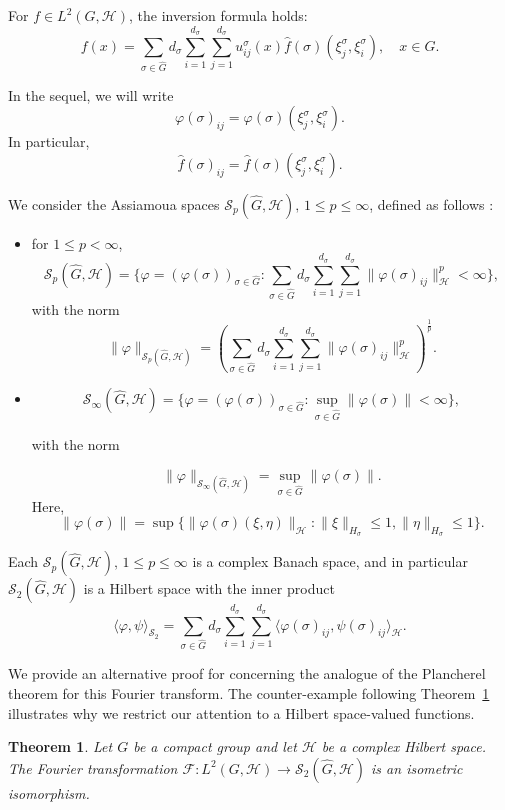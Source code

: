 \documentclass[11pt]{amsart}
\newtheorem{theorem}{Theorem}[section]
\begin{document}
For $f\in L^2(G,\mathcal{H})$, the inversion formula holds:
\begin{equation}\label{eq:inversionformula}
f(x)=\sum_{\sigma\in\widehat{G}}d_\sigma\sum_{i=1}^{d_\sigma}\sum_{j=1}^{d_\sigma}u^\sigma_{ij}(x)\widehat f(\sigma)(\xi_j^\sigma,
\xi_i^\sigma),\quad x\in G.
\end{equation}

In the sequel, we will write
$$\varphi(\sigma)_{ij}=\varphi(\sigma)(\xi_j^\sigma,
\xi_i^\sigma).$$ In particular, 
$$\widehat f(\sigma)_{ij}=\widehat f(\sigma)(\xi_j^\sigma,
\xi_i^\sigma).$$

We consider the Assiamoua spaces $\mathscr{S}_p(\widehat{G}, \mathcal{H}),\, 1\le p\le \infty$, defined as follows \cite{Mensah2024}:
\begin{itemize}
\item for $1\le p<\infty$, 
$$\mathscr{S}_p(\widehat{G},\mathcal{H})=\Big\{\varphi=(\varphi(\sigma))_{\sigma\in \widehat{G}}:
\sum_{\sigma\in \widehat{G}} d_\sigma\sum_{i=1}^{d_\sigma}\sum_{j=1}^{d_\sigma}\|\varphi(\sigma)_{ij}\|_\mathcal{H}^p<\infty\Big\},
$$
with the norm 
$$ \|\varphi\|_{\mathscr{S}_p(\widehat{G},\mathcal{H})}=\left(\sum_{\sigma\in \widehat{G}} d_\sigma\sum_{i=1}^{d_\sigma}\sum_{j=1}^{d_\sigma}\|\varphi(\sigma)_{ij}\|_\mathcal{H}^p\right)^{\frac{1}{p}}.
$$
\item $$\mathscr{S}_\infty(\widehat{G},\mathcal{H})=\Big\{  \varphi=(\varphi(\sigma))_{\sigma\in \widehat{G}}: \sup_{\sigma \in \widehat{G}}\|\varphi(\sigma)\| <\infty \Big\},$$

with the norm 

$$\|\varphi\|_{\mathscr{S}_\infty(\widehat{G},\mathcal{H})}=\sup_{\sigma \in \widehat{G}}\|\varphi(\sigma)\|.$$
Here,  
$$\|\varphi(\sigma)\|=\sup\Big\{\|\varphi(\sigma)(\xi,\eta)\|_{\mathcal{H}}: \|\xi\|_{H_\sigma}\leq 1, \|\eta\|_{H_\sigma}\leq 1\Big\}.$$
\end{itemize}

 
\noindent Each $\mathscr{S}_p(\widehat{G},\mathcal{H}), \, 1\leq p\leq \infty$ is a complex Banach
space, and in particular $\mathscr{S}_2(\widehat{G},\mathcal{H})$ is a Hilbert space with the inner product
$$\langle\varphi,\psi\rangle_{\mathscr{S}_2}=\sum_{\sigma\in \widehat{G}} d_\sigma\sum_{i=1}^{d_\sigma}\sum_{j=1}^{d_\sigma}\langle
\varphi(\sigma)_{ij},\psi(\sigma)_{ij}\rangle_\mathcal{H}.$$

\noindent We provide an alternative proof for \cite[Theorem 4.8]{Assiamoua1989} concerning the analogue of the Plancherel theorem for this Fourier transform. The counter-example following  Theorem~\ref{theo:plancherel} illustrates why we restrict our attention to a Hilbert space-valued functions. 
\begin{theorem}\label{theo:plancherel}
Let $G$ be a compact group and let $\mathcal{H}$ be a complex Hilbert space.   The Fourier transformation $\mathscr{F}:L^2(G,\mathcal{H})\to \mathscr{S}_2(\widehat{G},\mathcal{H})$ is an isometric isomorphism.
\end{theorem}
\end{document}
